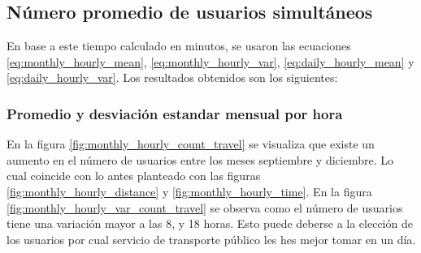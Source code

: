 \subsection{Número promedio de usuarios simultáneos}

En base a este tiempo calculado en minutos, se usaron las ecuaciones \ref{eq:monthly_hourly_mean}, \ref{eq:monthly_hourly_var}, \ref{eq:daily_hourly_mean} y \ref{eq:daily_hourly_var}. Los resultados obtenidos son los siguientes:

\subsubsection{Promedio y desviación estandar mensual por hora}

En la figura \ref{fig:monthly_hourly_count_travel} se visualiza que existe un aumento en el número de usuarios entre los meses septiembre y diciembre. Lo cual coincide con lo antes planteado con las figuras \ref{fig:monthly_hourly_distance} y \ref{fig:monthly_hourly_time}. En la figura \ref{fig:monthly_hourly_var_count_travel} se observa como el número de usuarios tiene una variación mayor a las 8, y 18 horas. Esto puede deberse a la elección de los usuarios por cual servicio de transporte público les hes mejor tomar en un día.

